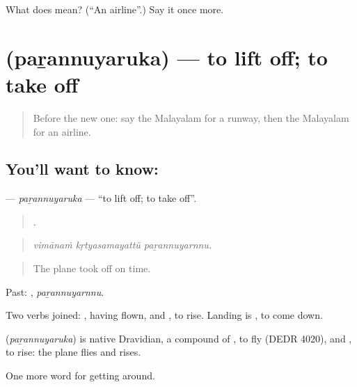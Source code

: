 \begin{tcolorbox}[breakable,colback=teal!4,colframe=teal!35!black,title={Before you move on}]
What does  mean? (\textquotedblleft{}An airline\textquotedblright{}.) Say it once more.
\end{tcolorbox}
\section[\texorpdfstring{\ml{പറന്നുയരുക} (paṟannuyaruka)}{പറന്നുയരുക (paṟannuyaruka)}]{ (paṟannuyaruka) — to lift off; to take off}

\label{lesson:ML-C463-parannuyaruka}



\begin{quote}
Before the new one: say the Malayalam for a runway, then the Malayalam for an airline.
\end{quote}

\subsection*{You'll want to know: }
\textbf{} — \emph{paṟannuyaruka} — \textquotedblleft{}to lift off; to take off\textquotedblright{}.

\begin{quote}
  .
\end{quote}

\begin{quote}
\emph{vimānaṁ kṛtyasamayattŭ paṟannuyarnnu.}
\end{quote}

\begin{quote}
The plane took off on time.
\end{quote}

Past: , \emph{paṟannuyarnnu}.

Two verbs joined: , having flown, and , to rise. Landing is , to come down.

\begin{cousinweb}
\textbf{} (\emph{paṟannuyaruka}) is native Dravidian, a compound of , to fly (DEDR 4020), and , to rise: the plane flies and rises.
\end{cousinweb}

\begin{grammarlens}[title={What you've built}]
One more word for getting around.
\end{grammarlens}

